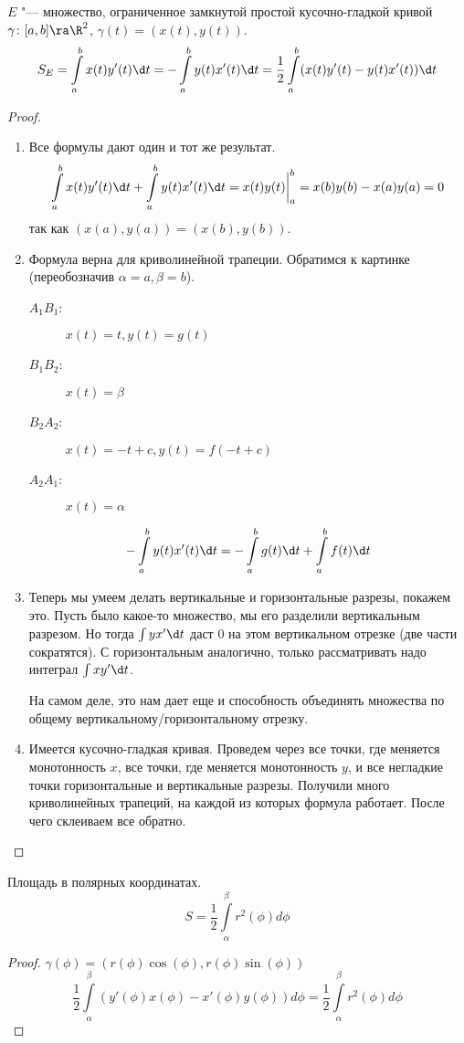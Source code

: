 \begin{theorem}
	$E$ "--- множество, ограниченное замкнутой простой кусочно-гладкой кривой\\
	$\gamma \colon [a,b] \ra \R^2$, $\gamma(t) = (x(t), y(t))$.
	\[ S_E = \int\limits_a^b x(t)y'(t)\d t = -\int\limits_a^b y(t)x'(t) \d t = \frac{1}{2} \int\limits_a^b (x(t)y'(t) - y(t)x'(t))\d t \]
\end{theorem}
\begin{proof}
	\begin{enumerate}
	\item
		Все формулы дают один и тот же результат.
		\[ \int\limits_a^b x(t)y'(t) \d t + \int\limits_a^b y(t)x'(t) \d t = x(t)y(t) \bigg|_a^b = x(b)y(b) - x(a)y(a) = 0 \]
		так как $(x(a), y(a)) = (x(b), y(b))$.

	\item
		Формула верна для криволинейной трапеции. Обратимся к картинке (переобозначив $\alpha = a, \beta = b$).
		\begin{description}
			\item[$A_1B_1$:] $x(t) = t, y(t) = g(t)$
			\item[$B_1B_2$:] $x(t) = \beta$
			\item[$B_2A_2$:] $x(t) = -t + c, y(t) = f(-t + c)$
			\item[$A_2A_1$:] $x(t) = \alpha$
		\end{description}
		\[ -\int\limits_a^b y(t)x'(t) \d t = -\int\limits_a^b g(t) \d t + \int\limits_a^b f(t) \d t \]

	\item
		Теперь мы умеем делать вертикальные и горизонтальные разрезы, покажем это.
		Пусть было какое-то множество, мы его разделили вертикальным разрезом.
		Но тогда $\int y x' \d t$ даст 0 на этом вертикальном отрезке (две части сократятся).
		С горизонтальным аналогично, только рассматривать надо интеграл $\int x y' \d t$.

		На самом деле, это нам дает еще и способность объединять множества по общему вертикальному/горизонтальному отрезку.

	\item
		Имеется кусочно-гладкая кривая.
		Проведем через все точки, где меняется монотонность $x$, все точки, где меняется монотонность $y$, и все негладкие точки горизонтальные и вертикальные разрезы.
		Получили много криволинейных трапеций, на каждой из которых формула работает.
		После чего склеиваем все обратно.
	\end{enumerate}
\end{proof}

\begin{conseq}
	Площадь в полярных координатах.
	\[ S = \frac{1}{2}\int\limits_\alpha^\beta r^2(\phi) d\phi \]
\end{conseq}
\begin{proof}
	$\gamma(\phi) = (r(\phi)\cos(\phi), r(\phi)\sin(\phi))$
	\[ \frac{1}{2} \int\limits_\alpha^\beta (y'(\phi)x(\phi) - x'(\phi)y(\phi)) d\phi = \frac{1}{2} \int\limits_\alpha^\beta r^2(\phi) d\phi \]
\end{proof}
